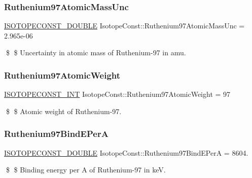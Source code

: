 \subsubsection{\texorpdfstring{Ruthenium97\+Atomic\+Mass\+Unc}{Ruthenium97AtomicMassUnc}}
{\footnotesize\ttfamily \mbox{\hyperlink{group___isotope_const-_macros_ga8f45a7272ce02c0b4c65c44636ed719a}{I\+S\+O\+T\+O\+P\+E\+C\+O\+N\+S\+T\+\_\+\+D\+O\+U\+B\+LE}} Isotope\+Const\+::\+Ruthenium97\+Atomic\+Mass\+Unc = 2.\+965e-\/06}

\$ \$ Uncertainty in atomic mass of Ruthenium-\/97 in amu. \mbox{\label{group___isotope_const-_ruthenium-_ru97_ga07e716ccc0f5b5ea467e4dd254349cdb}} 
\subsubsection{\texorpdfstring{Ruthenium97\+Atomic\+Weight}{Ruthenium97AtomicWeight}}
{\footnotesize\ttfamily \mbox{\hyperlink{group___isotope_const-_macros_ga5f18360b3e99483a35c32d789e62621c}{I\+S\+O\+T\+O\+P\+E\+C\+O\+N\+S\+T\+\_\+\+I\+NT}} Isotope\+Const\+::\+Ruthenium97\+Atomic\+Weight = 97}

\$ \$ Atomic weight of Ruthenium-\/97. \mbox{\label{group___isotope_const-_ruthenium-_ru97_ga8d8203965b446fe0b77517a12f6079dd}} 
\subsubsection{\texorpdfstring{Ruthenium97\+Bind\+E\+PerA}{Ruthenium97BindEPerA}}
{\footnotesize\ttfamily \mbox{\hyperlink{group___isotope_const-_macros_ga8f45a7272ce02c0b4c65c44636ed719a}{I\+S\+O\+T\+O\+P\+E\+C\+O\+N\+S\+T\+\_\+\+D\+O\+U\+B\+LE}} Isotope\+Const\+::\+Ruthenium97\+Bind\+E\+PerA = 8604.}

\$ \$ Binding energy per A of Ruthenium-\/97 in keV. \mbox{\label{group___isotope_const-_ruthenium-_ru97_gacad76cbea9c0c36d5f8fca61c9462f8f}} 
